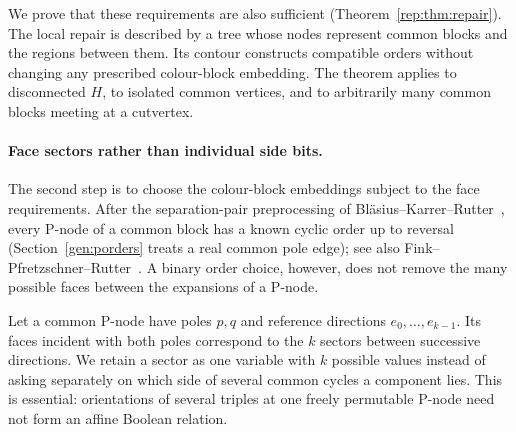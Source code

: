 We prove that these requirements are also sufficient
(Theorem~\ref{rep:thm:repair}).  The local repair is described by a tree
whose nodes represent common blocks and the regions between them.  Its
contour constructs compatible orders without changing any prescribed
colour-block embedding.  The theorem applies to disconnected $H$, to
isolated common vertices, and to arbitrarily many common blocks meeting
at a cutvertex.

\paragraph{Face sectors rather than individual side bits.}
The second step is to choose the colour-block embeddings subject to the
face requirements.  After the separation-pair preprocessing of
Bl\"asius--Karrer--Rutter~\cite[Lemmas~2--4 and Theorem~2]{bkr}, every
P-node of a common block has a known cyclic order up to reversal
(Section~\ref{gen:porders} treats a real common pole edge); see also
Fink--Pfretzschner--Rutter~\cite[Lemma~4(c)]{fpr}.  A binary order choice,
however, does not remove the many possible faces between the expansions
of a P-node.

Let a common P-node have poles $p,q$ and reference directions
$e_0,\ldots,e_{k-1}$.  Its faces incident with both poles correspond to
the $k$ sectors between successive directions.  We retain a sector as one
variable with $k$ possible values instead of asking separately on which
side of several common cycles a component lies.  This is essential:
orientations of several triples at one freely permutable P-node need not
form an affine Boolean relation.

